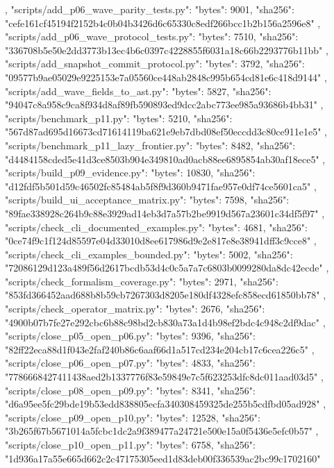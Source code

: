 {{{    },
    "scripts/add_p06_wave_parity_tests.py": {
      "bytes": 9001,
      "sha256": "cefe161cf45194f2152b4c0b04b3426d6c65330c8edf266bcc1b2b156a2596e8"
    },
    "scripts/add_p06_wave_protocol_tests.py": {
      "bytes": 7510,
      "sha256": "336708b5e50e2dd3773b13ec4b6c0397c4228855f6031a18c66b2293776b11bb"
    },
    "scripts/add_snapshot_commit_protocol.py": {
      "bytes": 3792,
      "sha256": "09577b9ae05029e9225153e7a05560ce448ab2848c995b654cd81e6c418d9144"
    },
    "scripts/add_wave_fields_to_ast.py": {
      "bytes": 5827,
      "sha256": "94047c8a958c9ca8f934d8af89fb590893ed9dcc2abc773ee985a93686b4bb31"
    },
    "scripts/benchmark_p11.py": {
      "bytes": 5210,
      "sha256": "567d87ad695d16673cd71614119ba621e9eb7dbd08ef50eccdd3c80ce911e1e5"
    },
    "scripts/benchmark_p11_lazy_frontier.py": {
      "bytes": 8482,
      "sha256": "d4484158cded5e41d3ce8503b904e349810ad0acb88ee6895854ab30af18ece5"
    },
    "scripts/build_p09_evidence.py": {
      "bytes": 10830,
      "sha256": "d12fdf5b501d59c46502fc85484ab5f8f9d360b9471fae957e0df74ce5601ca5"
    },
    "scripts/build_ui_acceptance_matrix.py": {
      "bytes": 7598,
      "sha256": "89fae338928c264b9c88e3929ad14eb3d7a57b2be9919d567a23601c34df5f97"
    },
    "scripts/check_cli_documented_examples.py": {
      "bytes": 4681,
      "sha256": "0ce74f9c1f124d85597e04d33010d8ee617986d9e2e817e8e38941dff3c9cce8"
    },
    "scripts/check_cli_examples_bounded.py": {
      "bytes": 5002,
      "sha256": "72086129d123a489f56d2617bcdb53d4c0c5a7a7c6803b0099280da8dc42ecde"
    },
    "scripts/check_formalism_coverage.py": {
      "bytes": 2971,
      "sha256": "853fd366452aad688b8b59cb7267303d8205e180df4328efc858ecd61850bb78"
    },
    "scripts/check_operator_matrix.py": {
      "bytes": 2676,
      "sha256": "4900b07b7fe27e292cbc6b88c98bd2cb830a73a1d4b98ef2bdc4c948c2df9dac"
    },
    "scripts/close_p05_open_p06.py": {
      "bytes": 9396,
      "sha256": "82ff22eca88d1f043e2faf240b86c6aaf66d1a517cd234e204cb17c6cea226c5"
    },
    "scripts/close_p06_open_p07.py": {
      "bytes": 4833,
      "sha256": "7786668427411438aed2b1337776f83e59849e7c5f623253dfc8dc011aad03d5"
    },
    "scripts/close_p08_open_p09.py": {
      "bytes": 8341,
      "sha256": "d6a95ee5fc29bde19b53edd838805ecfa340308459325de255b5cdfbd05ad928"
    },
    "scripts/close_p09_open_p10.py": {
      "bytes": 12528,
      "sha256": "3b265f67b5671014a5fcbc1dc2a9f389477a24721e500e15a0f5436e5efc0b57"
    },
    "scripts/close_p10_open_p11.py": {
      "bytes": 6758,
      "sha256": "1d936a17a55e665d662c2c47175305eed1d83deb00f336539ac2bc99c1702160"
}}}
